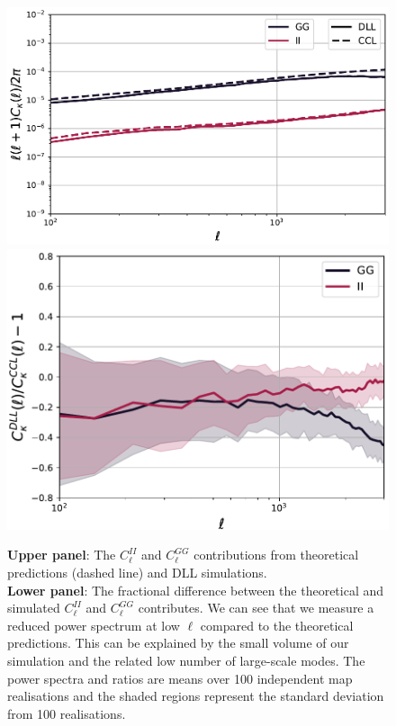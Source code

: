 \documentclass[twocolumn,twocolappendix]{aastex63}
\begin{document}
\begin{figure}
    \centering
    \includegraphics[width=\columnwidth]{paper/figures/IA_validation.pdf}
    \includegraphics[width=\columnwidth]{paper/figures/IA_validation_res.pdf}
    \caption{ \textbf{Upper panel}: The $C_{\ell}^{II}$ and $C_{\ell}^{GG}$ contributions from theoretical predictions (dashed line) and DLL simulations. \\
     \textbf{Lower panel}: The fractional difference between the theoretical and simulated $C_{\ell}^{II}$ and $C_{\ell}^{GG}$ contributes.
     We can see that we measure a reduced power spectrum at low $\ell$ compared to the theoretical predictions. This can be explained by the small volume of our simulation and the related low number of large-scale modes.
     The power spectra and ratios are means over 100 independent map realisations and the shaded regions represent the standard deviation from 100 realisations.}
    \label{fig:ia_validation}
\end{figure}
\end{document}
